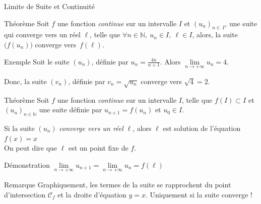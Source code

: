 \documentclass{coursbook}
\begin{document}
    \begin{Gpartie}{Limite de Suite et Continuité} 
        \vspace{-4ex}
        \begin{Spartie}{Théorème} 
            Soit $f$ une fonction \emph{continue} sur un intervalle $I$ et $(u_n)_{n\in\ I}$, une suite qui converge vers un réel $\ell$, telle que $\forall n\in\mathbb{N},\ u_n\in I,~\ell\in I$, alors, la suite $\big(f(u_n)\big)$ converge vers~$f(\ell)$.
            \begin{SSpartie}{Exemple} 
                Soit le suite $(u_n)$, définie par $u_n=\frac{4n}{n+1}$. Alors $\lim\limits_{n\to +\infty}u_n=4$.
                
                Donc, la suite $(v_n)$, définie par $v_n=\sqrt{u_n}$ converge vers $\sqrt{4}=2$.
            \end{SSpartie}
        \end{Spartie}
        \vspace{-4ex}
        \begin{Spartie}{Théorème}
            Soit $f$ une fonction \emph{continue} sur un intervalle $I$, telle que $f(I)\subset I$ et $(u_n)_{n\in\mathbb{N}}$ une suite définie par $u_{n+1}=f(u_n)$ et $u_0\in I$.
            
            Si la suite $(u_n)$ \emph{converge vers un réel} $\ell$, alors $\ell$ est solution de l'équation $f(x)=x$ \\ On peut dire que $\ell$ est un point fixe de $f$.
            \begin{SSpartie}{Démonstration} 
                $\lim\limits_{n\to +\infty}u_{n+1}=\lim\limits_{n\to +\infty}u_n=f(\ell)$
            \end{SSpartie}
            \begin{SSpartie}{Remarque} 
                Graphiquement, les termes de la suite se rapprochent du point d'intersection $\mathcal{C}_f$ et la droite d'équation $y=x$. Uniquement si la suite converge !
                \begin{center}
\end{center}
\end{SSpartie}
\end{Spartie}
\end{Gpartie}
\end{document}

